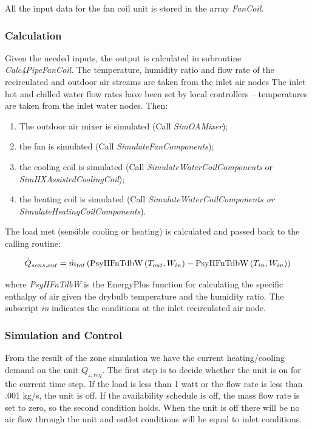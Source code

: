 All the input data for the fan coil unit is stored in the array \emph{FanCoil}.

\subsubsection{Calculation}\label{calculation-3-000}

Given the needed inputs, the output is calculated in subroutine \emph{Calc4PipeFanCoil}. The temperature, humidity ratio and flow rate of the recirculated and outdoor air streams are taken from the inlet air nodes The inlet hot and chilled water flow rates have been set by local controllers -- temperatures are taken from the inlet water nodes. Then:

\begin{enumerate}
\item The outdoor air mixer is simulated (Call \emph{SimOAMixer});
\item the fan is simulated (Call \emph{SimulateFanComponents});
\item the cooling coil is simulated (Call \emph{SimulateWaterCoilComponents} or \emph{SimHXAssistedCoolingCoil});
\item the heating coil is simulated (Call \emph{SimulateWaterCoilComponents or SimulateHeatingCoilComponents}).
\end{enumerate}

The load met (sensible cooling or heating) is calculated and passed back to the calling routine:

\begin{equation}
  \dot{Q}_{sens,out} = \dot{m}_{tot} \PB{\text{PsyHFnTdbW}\PB{T_{out},W_{in}} - \text{PsyHFnTdbW}\PB{T_{in},W_{in}}}
\end{equation}

where \emph{PsyHFnTdbW} is the EnergyPlus function for calculating the specific enthalpy of air given the drybulb temperature and the humidity ratio. The subscript \emph{in} indicates the conditions at the inlet recirculated air node.

\subsubsection{Simulation and Control}\label{simulation-and-control-3-000}

From the result of the zone simulation we have the current heating/cooling demand on the unit \({\dot Q_{z,req}}\). The first step is to decide whether the unit is on for the current time step. If the load is less than 1 watt or the flow rate is less than .001 kg/s, the unit is off. If the availability schedule is off, the mass flow rate is set to zero, so the second condition holds. When the unit is off there will be no air flow through the unit and outlet conditions will be equal to inlet conditions.

